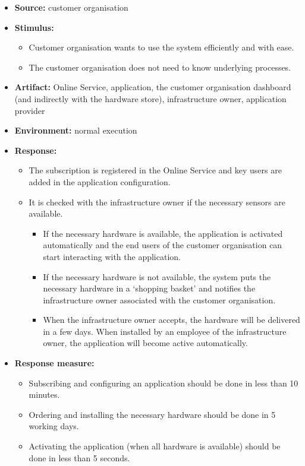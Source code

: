 \documentclass[english]{sareport}
\begin{document}
\begin{itemize}
    \item \textbf{Source:} customer organisation
    \item \textbf{Stimulus:}
    \begin{itemize}
    \item Customer organisation wants to use the system efficiently and with ease.
    \item The customer organisation does not need to know underlying processes.
    \end{itemize}
    \item \textbf{Artifact:} Online Service, application, the customer organisation dashboard (and indirectly with the hardware store), infrastructure owner, application provider
    \item \textbf{Environment:} normal execution
    \item \textbf{Response:}
        \begin{itemize}
            \item The subscription is registered in the Online Service and key users are added in the application configuration.
            \item It is checked with the infrastructure owner if the necessary sensors are available.
            \begin{itemize} 
            \item If the necessary hardware is available, the application is activated automatically and the end users of the customer organisation can start interacting with the application.
            \item If the necessary hardware is not available, the system puts the necessary hardware in a `shopping basket' and notifies the infrastructure owner associated with the customer organisation.
            \item When the infrastructure owner accepts, the hardware will be delivered in a few days. When installed by an employee of the infrastructure owner, the application will become active automatically.
            \end{itemize}
        \end{itemize}

    \item \textbf{Response measure:}
        \begin{itemize}
            \item Subscribing and configuring an application should be done in less than 10 minutes.
            \item Ordering and installing the necessary hardware should be done in 5 working days.
            \item Activating the application (when all hardware is available) should be done in less than 5 seconds.
        \end{itemize}
\end{itemize}
\end{document}
